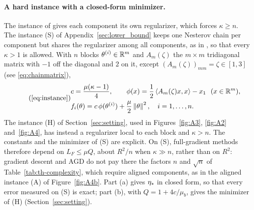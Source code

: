 \paragraph{A hard instance with a closed-form minimizer.}
The instance of  gives each component its own regularizer, which forces $\kappa\ge n$. The instance (S)
of Appendix~\ref{sec:lower_bound} keeps one Nesterov chain per component but shares the regularizer among all components,
as in \cite{agarwal2015lower}, so that every $\kappa>1$ is allowed. With $n$ blocks $\theta^{(i)}\in\mathbb{R}^m$ and
$A_m(\zeta)$ the $m\times m$ tridiagonal matrix with $-1$ off the diagonal and $2$ on it, except
$(A_m(\zeta))_{mm}=\zeta\in[1,3]$ (see \eqref{eq:chainmatrix}),
\begin{equation*}\tag{\ref*{eq:instance}}
\begin{aligned}
&c=\frac{\mu(\kappa-1)}{4},\qquad \phi(x)=\frac12\inner{A_m(\zeta)x}{x}-x_1\ \ (x\in\R^m),\\
&f_i(\theta)=c\,\phi(\theta^{(i)})+\frac\mu2\norm{\theta}^2,\quad i=1,\dots,n .
\end{aligned}
\end{equation*}
The instance (H) of Section~\ref{sec:setting}, used in Figures~\ref{fig:A3}, \ref{fig:A2} and~\ref{fig:A4}, has instead
a regularizer local to each block and $\kappa>n$. The constants and the minimizer of (S) are explicit.
On (S), full-gradient methods therefore depend on $L_F\le\mu Q$, about $R^2/n$ when $\kappa\gg n$, rather than on $R^2$:
gradient descent and AGD do not pay there the factors $n$ and $\sqrt n$ of Table~\ref{tab:th-complexity}, which require
aligned components, as in the aligned instance (A) of Figure~\ref{fig:A4b}.
Part (a) gives $\eta_\ast$ in closed form, so that every error measured on (S) is exact; part (b), with $Q=1+4c/\mu_b$,
gives the minimizer of (H) (Section~\ref{sec:setting}).

